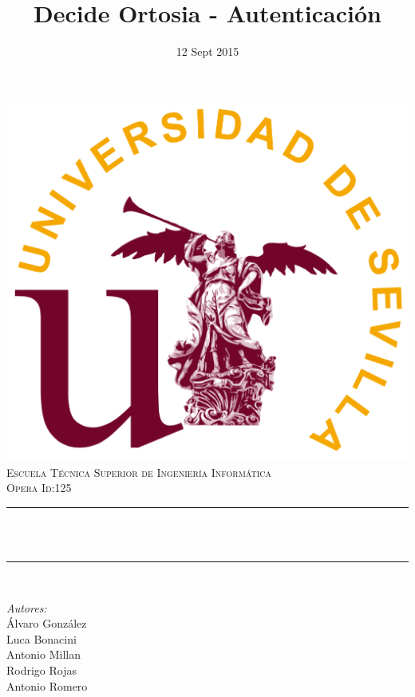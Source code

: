 \documentclass[12pt]{article}
\title{Decide Ortosia - Autenticación}								%
\date{12 Sept 2015}											%
\makeatletter
\let\thetitle\@title
\makeatother
\begin{document}

\begin{titlepage}
	\centering
    \vspace*{0.5 cm}
    \includegraphics[scale = 0.2]{logo.png}\\[1.0 cm]	%
    \textsc{\LARGE Escuela Técnica Superior de Ingeniería  \newline\newline Informática}\\[2.0 cm]	%
	\textsc{\Large Opera Id:125}\\[0.5 cm]				%
	\rule{\linewidth}{0.2 mm} \\[0.4 cm]
	{ \huge \bfseries \thetitle}\\
	\rule{\linewidth}{0.2 mm} \\[1.5 cm]
	
	\begin{minipage}{0.4\textwidth}
		\begin{flushleft} \large
			\emph{Autores:}\\
			Álvaro González \\		
			Luca Bonacini\\
            Antonio Millan \\
            Rodrigo Rojas \\
            Antonio Romero \\
			\end{flushleft}
			\end{minipage}~
			\begin{minipage}{0.4\textwidth}
            

\end{minipage}
\end{titlepage}
\end{document}
